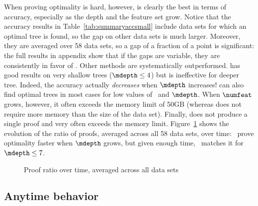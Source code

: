 \documentclass{article}
\begin{document}
When proving optimality is hard, however, \blossom is clearly the best in terms of accuracy, especially as the depth and the feature set grow. Notice that the accuracy results in Table~\ref{tab:summaryaccsmall} include data sets for which an optimal tree is found, so the gap on other data sets is much larger. Moreover, they are averaged over 58 data sets, so a gap of a fraction of a point is significant: the full results in appendix show that if the gaps are variable, they are consistently in favor of \blossom.
Other methods are systematically outperformed. \cp has good results on very shallow trees ($\mdepth \leq 4$) but is ineffective for deeper tree. Indeed, the accuracy actually \emph{decreases} when $\mdepth$ increases! \dleight can also find optimal trees in most cases 
for low values of \numfeat\ and $\mdepth$.
When $\numfeat$ grows, however, it often exceeds the memory limit of 50GB (whereas \blossom does not require more memory than the size of the data set). Finally, \binoct does not produce a single proof and very often exceeds the memory limit.%
Figure~\ref{fig:proofcactus} shows the evolution of the ratio of proofs, averaged across all 58 data sets, over time: \blossom\ 
prove optimality faster when $\mdepth$ grows, but given enough time, \murtree\ matches it for $\mdepth \leq 7$.
 
 
 \begin{figure}[htbp]
 	\subfloat[maximum depth = 4]{}
 	\subfloat[maximum depth = 7]{}
 	\subfloat[maximum depth = 10]{}
 	\caption{\label{fig:proofcactus}Proof ratio over time, averaged across all data sets}
 \end{figure}





\subsection{Anytime behavior}
\end{document}
